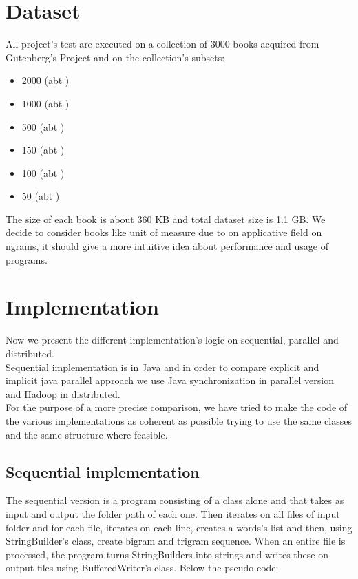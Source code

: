 \documentclass[10pt,twocolumn,letterpaper]{article}
\begin{document}
\section{Dataset}
All project's test are executed on a collection of 3000 books acquired from Gutenberg's Project and on the collection's subsets:
\begin{itemize}
\item 2000 (abt )
\item 1000 (abt )
\item 500 (abt )
\item 150 (abt )
\item 100 (abt )
\item 50 (abt )
\end{itemize}

The size of each book is about 360 KB and total dataset size is 1.1 GB. We decide to consider books like unit of measure due to on applicative field on ngrams, it should give a more intuitive idea about performance and usage of programs.\\

\section{Implementation}


Now we present the different implementation's logic on sequential, parallel and distributed.\\
Sequential implementation is in Java and in order to compare explicit and implicit java parallel approach we use Java synchronization in parallel version and Hadoop in distributed.\\
For the purpose of a more precise comparison, we have tried to make the code of the various implementations as coherent as possible trying to use the same classes and the same structure where feasible.

\subsection{Sequential implementation}

The sequential version is a program consisting of a class alone and that takes as input and output the folder path of each one. Then iterates on all files of input folder and for each file, iterates on each line, creates a words's list and then, using StringBuilder's class, create bigram and trigram sequence. When an entire file is processed, the program turns StringBuilders into strings and writes these on output files using BufferedWriter's class. Below the pseudo-code:
\end{document}
